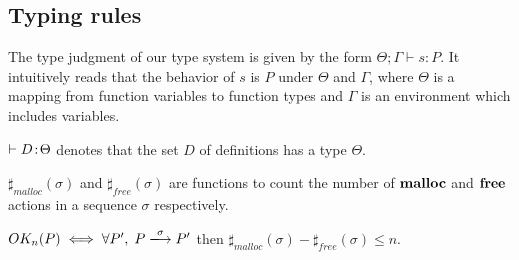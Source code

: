 \subsection{Typing rules}
The type judgment of our type system is given by the form $\Theta ;
\Gamma \vdash s : P$. It intuitively reads that the behavior of $s$ is
$P$ under $\Theta$ and $\Gamma$, where \(\Theta\) is a mapping from function variables to function types and \(\Gamma\) is an environment which includes variables.%

\(\vdash D \!:\! \Theta\) denotes that the set \(D\) of definitions has a type \(\Theta\).
\begin{myDef}[\(\sharp_{\rho}(\sigma)\)]
 \(\sharp_{malloc}(\sigma)\) and \(\sharp_{free}(\sigma)\) are functions to count the number of \(\mathbf{malloc}\) and \( \mathbf{free} \) actions in a sequence \( \sigma\) respectively.
 \label{df:sharf}
 \end{myDef}

 \begin{myDef}
   \(OK_{n}(P) \iff \forall P',\; P \xlongrightarrow{\sigma}P'\) then \(\sharp_{malloc}(\sigma)-\sharp_{free}(\sigma)\le n\).
 \label{df:okn}
 \end{myDef}

